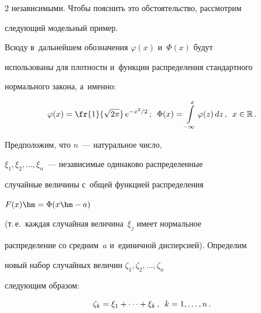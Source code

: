 \begin{multicols}{2}
независимыми. Чтобы пояснить это обстоятельство, рассмотрим


следующий модельный пример.





Всюду в~дальнейшем обозначения $\varphi(x)$ и~$\Phi(x)$ будут


использованы для плотности и~функции распределения стандартного


нормального закона, а~именно:





\noindent


\begin{equation*}


\varphi(x)=\fr{1}{\sqrt{2\pi}}\,e^{-x^2/2}\,;\enskip


\Phi(x)=\int\limits_{-\infty}^{x}\varphi(z)\,dz\,,\enskip x\in\mathbb{R}\,.


\end{equation*}





Предположим, что $n$~--- натуральное число,


$\xi_1,\xi_2,\ldots,\xi_n$~--- независимые одинаково распределенные


случайные величины с~общей функцией распределения


$F(x)\hm=\Phi(x\hm-a)$


(т.\,е.\ каждая случайная величина~$\xi_j$ имеет нормальное


распределение со средним~$a$ и~единичной дисперсией). Определим


новый набор случайных величин $\zeta_1,\zeta_2,\ldots,\zeta_n$


следующим образом:





\vspace*{2pt}





\noindent


\begin{equation*}


\zeta_k=\xi_1+\cdots+\xi_k\,,\enskip k=1,\ldots,n\,.


\end{equation*}





\vspace*{-2pt}






\end{multicols}
